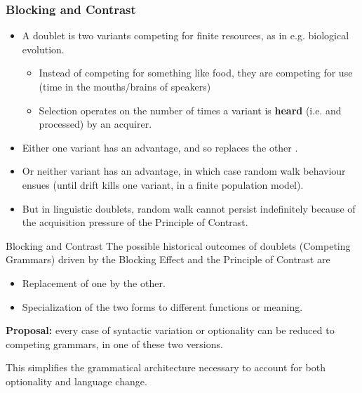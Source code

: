 \documentclass[hyperref={pdfpagelabels=false}]{beamer}
\begin{document}
\begin{frame}
\frametitle{Blocking and Contrast}
\begin{itemize}
	\item A doublet is two variants competing for finite resources, as in e.g. biological evolution.
		\begin{itemize} 
			\item Instead of competing for something like food, they are competing for use (time in the mouths/brains of speakers) 
			\item Selection operates on the number of times a variant is \textbf{heard} (i.e. and processed) by an acquirer. 		\end{itemize}
	\item Either one variant has an advantage, and so replaces the other \citep[following a logistic function;][]{nowak2006}.
	\item Or neither variant has an advantage, in which case random walk behaviour ensues (until drift kills one variant, in a finite population model).
	\item But in linguistic doublets, random walk cannot persist indefinitely because of the acquisition pressure of the Principle of Contrast.
\end{itemize}
\end{frame}


\begin{frame}{Blocking and Contrast}
	The possible historical outcomes of doublets (Competing Grammars) driven by the Blocking Effect and the Principle of Contrast are
	\begin{itemize} 
		\item Replacement of one by the other.
		\item Specialization of the two forms to different functions or meaning.
	\end{itemize}

	\textbf{Proposal:} every case of syntactic variation or optionality can be reduced to competing grammars, in one of these two versions.
	
	This simplifies the grammatical architecture necessary to account for both optionality and language change.
\end{frame}
\end{document}
